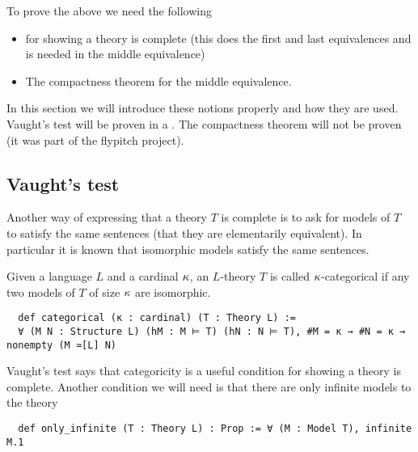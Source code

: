 To prove the above we need the following
\begin{itemize}
  \item {} for showing a theory is complete
        (this does the first and last equivalences and
        is needed in the middle equivalence)
  \item The compactness theorem for the middle equivalence.
\end{itemize}
In this section we will introduce these notions properly and how
they are used.
Vaught's test will be proven in a .
The compactness theorem will not be proven
(it was part of the flypitch project).

\subsection{Vaught's test}
Another way of expressing that a theory $T$ is complete is to
ask for models of $T$ to satisfy the same sentences
(that they are elementarily equivalent).
In particular it is known that isomorphic models %
satisfy the same sentences.

\begin{dfn}[Categoricity]
    Given a language $L$ and a cardinal $\kappa$,
    an $L$-theory $T$ is called $\kappa$-categorical
    if any two models of $T$ of size $\kappa$ are isomorphic.

    \begin{lstlisting}
  def categorical (κ : cardinal) (T : Theory L) :=
  ∀ (M N : Structure L) (hM : M ⊨ T) (hN : N ⊨ T), #M = κ → #N = κ → nonempty (M ≃[L] N) \end{lstlisting}
\end{dfn}

Vaught's test says that categoricity is a useful condition for showing a theory is complete.
Another condition we will need is that there are only infinite models to the theory

\begin{lstlisting}
  def only_infinite (T : Theory L) : Prop := ∀ (M : Model T), infinite M.1\end{lstlisting}


